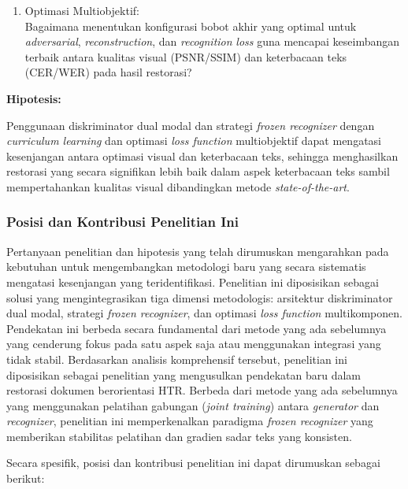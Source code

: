 \documentclass[12pt,a4paper]{article}
\begin{document}
\begin{enumerate}[leftmargin=*, labelindent=0pt, itemsep=1ex, topsep=0pt]
\begin{enumerate}[leftmargin=1.5em, labelsep=0.5em, itemindent=0pt, label=\arabic*., topsep=0pt, parsep=0pt, itemsep=0pt]
      \item Optimasi Multiobjektif: \\
            Bagaimana menentukan konfigurasi bobot akhir yang optimal untuk \textit{adversarial}, \textit{reconstruction}, dan \textit{recognition} \textit{loss} guna mencapai keseimbangan terbaik antara kualitas visual (PSNR/SSIM) dan keterbacaan teks (CER/WER) pada hasil restorasi?
\end{enumerate}


\noindent\textbf{Hipotesis:}



Penggunaan diskriminator dual modal dan strategi \textit{frozen recognizer} dengan \textit{curriculum learning} dan optimasi \textit{loss function} multiobjektif dapat mengatasi kesenjangan antara optimasi visual dan keterbacaan teks, sehingga menghasilkan restorasi yang secara signifikan lebih baik dalam aspek keterbacaan teks sambil mempertahankan kualitas visual dibandingkan metode \textit{state-of-the-art}.

\end{enumerate}

\subsubsection{Posisi dan Kontribusi Penelitian Ini}
\label{subsubsec:research-positioning}

Pertanyaan penelitian dan hipotesis yang telah dirumuskan mengarahkan pada kebutuhan untuk mengembangkan metodologi baru yang secara sistematis mengatasi kesenjangan yang teridentifikasi. Penelitian ini diposisikan sebagai solusi yang mengintegrasikan tiga dimensi metodologis: arsitektur diskriminator dual modal, strategi \textit{frozen recognizer}, dan optimasi \textit{loss function} multikomponen. Pendekatan ini berbeda secara fundamental dari metode yang ada sebelumnya yang cenderung fokus pada satu aspek saja atau menggunakan integrasi yang tidak stabil. Berdasarkan analisis komprehensif tersebut, penelitian ini diposisikan sebagai penelitian yang mengusulkan pendekatan baru dalam restorasi dokumen berorientasi HTR. Berbeda dari metode yang ada sebelumnya yang menggunakan pelatihan gabungan (\textit{joint training}) antara \textit{generator} dan \textit{recognizer}, penelitian ini memperkenalkan paradigma \textit{frozen recognizer} yang memberikan stabilitas pelatihan dan gradien sadar teks yang konsisten.

Secara spesifik, posisi dan kontribusi penelitian ini dapat dirumuskan sebagai berikut:
\end{document}
